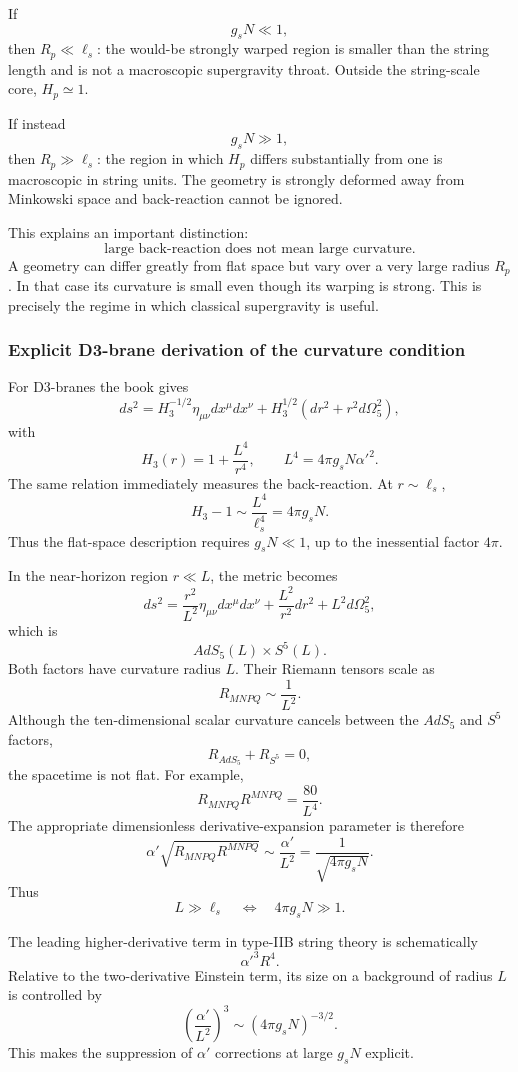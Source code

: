 \documentclass[
  10pt,
  a4paper,
  openany]{book}
\begin{document}
If \[
g_sN\ll1,
\] then \(R_p\ll\ell_s\): the would-be strongly warped region is smaller
than the string length and is not a macroscopic supergravity throat.
Outside the string-scale core, \(H_p\simeq1\).

If instead \[
g_sN\gg1,
\] then \(R_p\gg\ell_s\): the region in which \(H_p\) differs
substantially from one is macroscopic in string units. The geometry is
strongly deformed away from Minkowski space and back-reaction cannot be
ignored.

This explains an important distinction: \[
\boxed{
\text{large back-reaction does not mean large curvature}
}.
\] A geometry can differ greatly from flat space but vary over a very
large radius \(R_p\). In that case its curvature is small even though
its warping is strong. This is precisely the regime in which classical
supergravity is useful.

\subsubsection{Explicit D3-brane derivation of the curvature
condition}\label{explicit-d3-brane-derivation-of-the-curvature-condition}

For D3-branes the book gives \[
ds^2
=H_3^{-1/2}\eta_{\mu\nu}dx^\mu dx^\nu
+H_3^{1/2}
\left(
dr^2+r^2d\Omega_5^2
\right),
\] with \[
H_3(r)
=1+\frac{L^4}{r^4},
\qquad
L^4=4\pi g_sN\alpha'^2.
\] The same relation immediately measures the back-reaction. At
\(r\sim\ell_s\), \[
H_3-1
\sim
\frac{L^4}{\ell_s^4}
=4\pi g_sN.
\] Thus the flat-space description requires \(g_sN\ll1\), up to the
inessential factor \(4\pi\).

In the near-horizon region \(r\ll L\), the metric becomes \[
ds^2
=\frac{r^2}{L^2}\eta_{\mu\nu}dx^\mu dx^\nu
+\frac{L^2}{r^2}dr^2
+L^2d\Omega_5^2,
\] which is \[
AdS_5(L)\times S^5(L).
\] Both factors have curvature radius \(L\). Their Riemann tensors scale
as \[
R_{MNPQ}\sim\frac1{L^2}.
\] Although the ten-dimensional scalar curvature cancels between the
\(AdS_5\) and \(S^5\) factors, \[
R_{AdS_5}+R_{S^5}=0,
\] the spacetime is not flat. For example, \[
R_{MNPQ}R^{MNPQ}
=\frac{80}{L^4}.
\] The appropriate dimensionless derivative-expansion parameter is
therefore \[
\alpha'
\sqrt{R_{MNPQ}R^{MNPQ}}
\sim
\frac{\alpha'}{L^2}
=\frac1{\sqrt{4\pi g_sN}}.
\] Thus \[
\boxed{
L\gg\ell_s
\quad\Longleftrightarrow\quad
4\pi g_sN\gg1
}.
\]

The leading higher-derivative term in type-IIB string theory is
schematically \[
\alpha'^3R^4.
\] Relative to the two-derivative Einstein term, its size on a
background of radius \(L\) is controlled by \[
\left(\frac{\alpha'}{L^2}\right)^3
\sim
(4\pi g_sN)^{-3/2}.
\] This makes the suppression of \(\alpha'\) corrections at large
\(g_sN\) explicit.
\end{document}
